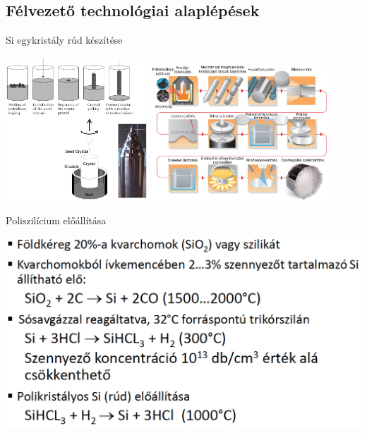 \documentclass[../eloadas.tex]{subfiles}
\begin{document}
    \subsection{Félvezető technológiai alaplépések}

        Si egykristály rúd készítése

        \includegraphics[width=0.4\textwidth]{./img/1.png} \includegraphics[width=0.5\textwidth]{./img/2.png}

        Poliszilícium előállítása

        \includegraphics[width=\textwidth]{./img/3.png}
\end{document}
